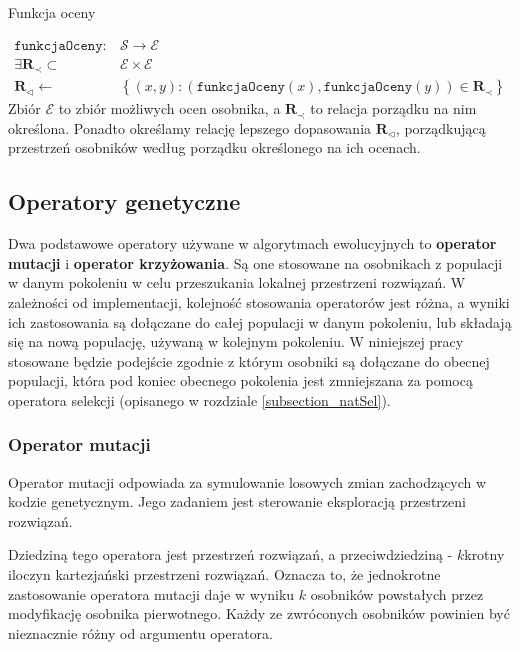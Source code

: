 \documentclass[twoside]{iisthesis}
\newcommand{\important}{\mathcal}
\newcommand{\R}{\mathbf{R}}
\newcommand{\minorityEvalRel}{{\R}_{\prec}}
\newcommand{\minoritySpecimenRel}{{\R}_{\lhd}}
\newcommand{\param}{\mathtt}
\begin{document}
\begin{signature}
	\caption{Funkcja oceny \label{signature_eval}}
	\begin{align}
		\param{funkcjaOceny}: &\important{S} \rightarrow \important{E} \\
		\exists \minorityEvalRel \subset &\important{E} \times \important{E} \\
		\minoritySpecimenRel \gets &\left\{ (x, y): (\param{funkcjaOceny}(x), \param{funkcjaOceny}(y)) \in \minorityEvalRel \right\}
	\end{align}
	Zbiór $\important{E}$ to zbiór możliwych ocen osobnika, 
	a $\minorityEvalRel$ to relacja porządku na nim określona. Ponadto określamy relację lepszego dopasowania $\minoritySpecimenRel$, porządkującą przestrzeń osobników według porządku określonego na ich ocenach. 
\end{signature}

\subsection{Operatory genetyczne}

Dwa podstawowe operatory używane w algorytmach ewolucyjnych to \textbf{operator mutacji} i \textbf{operator krzyżowania}. Są one stosowane na osobnikach z populacji w danym pokoleniu w celu przeszukania lokalnej przestrzeni rozwiązań. W zależności od implementacji, kolejność stosowania operatorów jest różna, a wyniki ich zastosowania są dołączane do całej populacji w danym pokoleniu, lub składają się na nową populację, używaną w kolejnym pokoleniu. W niniejszej pracy stosowane będzie podejście zgodnie z którym osobniki są dołączane do obecnej populacji, która pod koniec obecnego pokolenia jest zmniejszana za pomocą operatora selekcji (opisanego w rozdziale \ref{subsection_natSel}).

\subsubsection{Operator mutacji}
Operator mutacji odpowiada za symulowanie losowych zmian zachodzących w kodzie genetycznym. Jego zadaniem jest sterowanie eksploracją przestrzeni rozwiązań.

Dziedziną tego operatora jest przestrzeń rozwiązań, a przeciwdziedziną - $k$krotny iloczyn kartezjański przestrzeni rozwiązań. Oznacza to, że jednokrotne zastosowanie operatora mutacji daje w wyniku $k$ osobników powstałych przez modyfikację osobnika pierwotnego. Każdy ze zwróconych osobników powinien być nieznacznie różny od argumentu operatora. 
\end{document}
